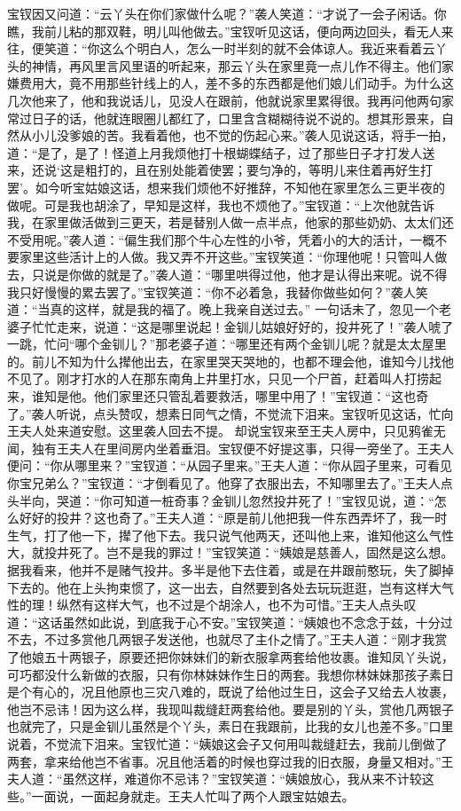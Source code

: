 \documentclass[12pt,oneside]{book}
\begin{document}
宝钗因又问道：“云丫头在你们家做什么呢？”袭人笑道：“才说了一会子闲话。你瞧，我前儿粘的那双鞋，明儿叫他做去。”宝钗听见这话，便向两边回头，看无人来往，便笑道：“你这么个明白人，怎么一时半刻的就不会体谅人。我近来看着云丫头的神情，再风里言风里语的听起来，那云丫头在家里竟一点儿作不得主。他们家嫌费用大，竟不用那些针线上的人，差不多的东西都是他们娘儿们动手。为什么这几次他来了，他和我说话儿，见没人在跟前，他就说家里累得很。我再问他两句家常过日子的话，他就连眼圈儿都红了，口里含含糊糊待说不说的。想其形景来，自然从小儿没爹娘的苦。我看着他，也不觉的伤起心来。”袭人见说这话，将手一拍，道：“是了，是了！怪道上月我烦他打十根蝴蝶结子，过了那些日子才打发人送来，还说‘这是粗打的，且在别处能着使罢；要匀净的，等明儿来住着再好生打罢’。如今听宝姑娘这话，想来我们烦他不好推辞，不知他在家里怎么三更半夜的做呢。可是我也胡涂了，早知是这样，我也不烦他了。”宝钗道：“上次他就告诉我，在家里做活做到三更天，若是替别人做一点半点，他家的那些奶奶、太太们还不受用呢。”袭人道：“偏生我们那个牛心左性的小爷，凭着小的大的活计，一概不要家里这些活计上的人做。我又弄不开这些。”宝钗笑道：“你理他呢！只管叫人做去，只说是你做的就是了。”袭人道：“哪里哄得过他，他才是认得出来呢。说不得我只好慢慢的累去罢了。”宝钗笑道：“你不必着急，我替你做些如何？”袭人笑道：“当真的这样，就是我的福了。晚上我亲自送过去。”
一句话未了，忽见一个老婆子忙忙走来，说道：“这是哪里说起！金钏儿姑娘好好的，投井死了！”袭人唬了一跳，忙问“哪个金钏儿？”那老婆子道：“哪里还有两个金钏儿呢？就是太太屋里的。前儿不知为什么撵他出去，在家里哭天哭地的，也都不理会他，谁知今儿找他不见了。刚才打水的人在那东南角上井里打水，只见一个尸首，赶着叫人打捞起来，谁知是他。他们家里还只管乱着要救活，哪里中用了！”宝钗道：“这也奇了。”袭人听说，点头赞叹，想素日同气之情，不觉流下泪来。宝钗听见这话，忙向王夫人处来道安慰。这里袭人回去不提。
却说宝钗来至王夫人房中，只见鸦雀无闻，独有王夫人在里间房内坐着垂泪。宝钗便不好提这事，只得一旁坐了。王夫人便问：“你从哪里来？”宝钗道：“从园子里来。”王夫人道：“你从园子里来，可看见你宝兄弟么？”宝钗道：“才倒看见了。他穿了衣服出去，不知哪里去了。”王夫人点头半向，哭道：“你可知道一桩奇事？金钏儿忽然投井死了！”宝钗见说，道：“怎么好好的投井？这也奇了。”王夫人道：“原是前儿他把我一件东西弄坏了，我一时生气，打了他一下，撵了他下去。我只说气他两天，还叫他上来，谁知他这么气性大，就投井死了。岂不是我的罪过！”宝钗笑道：“姨娘是慈善人，固然是这么想。据我看来，他并不是赌气投井。多半是他下去住着，或是在井跟前憨玩，失了脚掉下去的。他在上头拘束惯了，这一出去，自然要到各处去玩玩逛逛，岂有这样大气性的理！纵然有这样大气，也不过是个胡涂人，也不为可惜。”王夫人点头叹道：“这话虽然如此说，到底我于心不安。”宝钗笑道：“姨娘也不念念于兹，十分过不去，不过多赏他几两银子发送他，也就尽了主仆之情了。”王夫人道：“刚才我赏了他娘五十两银子，原要还把你妹妹们的新衣服拿两套给他妆裹。谁知凤丫头说，可巧都没什么新做的衣服，只有你林妹妹作生日的两套。我想你林妹妹那孩子素日是个有心的，况且他原也三灾八难的，既说了给他过生日，这会子又给去人妆裹，他岂不忌讳！因为这么样，我现叫裁缝赶两套给他。要是别的丫头，赏他几两银子也就完了，只是金钏儿虽然是个丫头，素日在我跟前，比我的女儿也差不多。”口里说着，不觉流下泪来。宝钗忙道：“姨娘这会子又何用叫裁缝赶去，我前儿倒做了两套，拿来给他岂不省事。况且他活着的时候也穿过我的旧衣服，身量又相对。”王夫人道：“虽然这样，难道你不忌讳？”宝钗笑道：“姨娘放心，我从来不计较这些。”一面说，一面起身就走。王夫人忙叫了两个人跟宝姑娘去。
\end{document}
